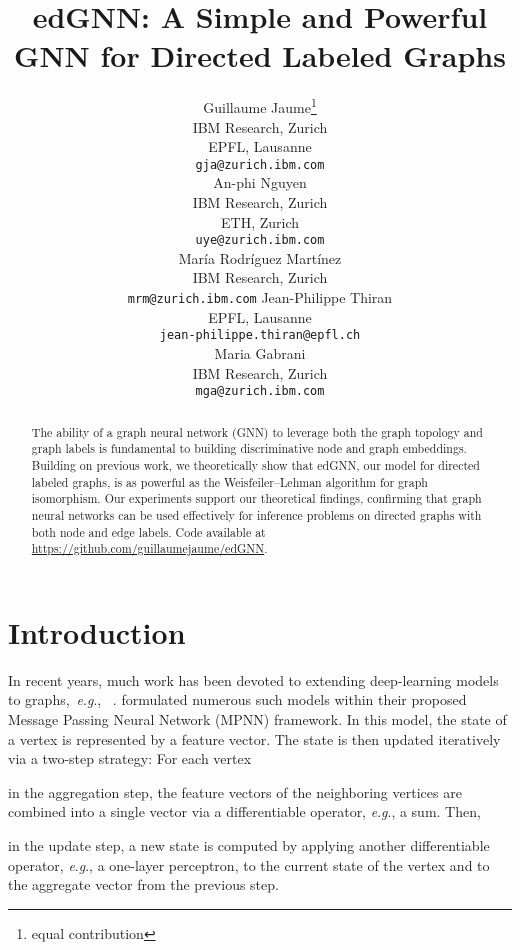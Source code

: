 \documentclass{article} \usepackage{iclr2019_conference,times}
\title{edGNN: A Simple and Powerful GNN for Directed Labeled Graphs}
\author{Guillaume Jaume\thanks{equal contribution} \\
IBM Research, Zurich \\
EPFL, Lausanne \\
\texttt{gja@zurich.ibm.com} \\
\And
An-phi Nguyen\footnotemark[1] \\
IBM Research, Zurich \\
ETH, Zurich \\
\texttt{uye@zurich.ibm.com} \\
\And 
Mar\'{i}a Rodr\'{i}guez Mart\'{i}nez \\
IBM Research, Zurich \\
\texttt{mrm@zurich.ibm.com}
\And 
Jean-Philippe Thiran \\
EPFL, Lausanne \\
\texttt{jean-philippe.thiran@epfl.ch} \\
\And
Maria Gabrani \\
IBM Research, Zurich \\
\texttt{mga@zurich.ibm.com} \\
}
\newcommand{\eg}{\textit{e}.\textit{g}., }
\begin{document}
\maketitle

\begin{abstract}

The ability of a graph neural network (GNN) to leverage both the graph topology and graph labels is fundamental to building discriminative node and graph embeddings. Building on previous work, we theoretically show that edGNN, our model for directed labeled graphs, is as powerful as the Weisfeiler--Lehman algorithm for graph isomorphism. Our experiments support our theoretical findings, confirming that graph neural networks can be  used effectively for inference problems on directed graphs with both node and edge labels. Code available at \url{https://github.com/guillaumejaume/edGNN}.

\end{abstract}













\section{Introduction}



In recent years, much work has been devoted to extending deep-learning models to graphs,~\eg~\cite{Scarselli2009, Bruna, Li2015b, Defferrard, Kipf2017, Hamilton2017, Hamilton2017a, Velickovic2017a, Ying2018a}. \cite{Gilmer2017a} formulated numerous such models within their proposed Message Passing Neural Network (MPNN) framework. In this model, the state of a vertex is represented by a feature vector. The state is then  updated iteratively via a two-step strategy: For each vertex \begin{inparaenum}[(i)]
\item in the aggregation step, the feature vectors of the neighboring vertices are combined into a single vector via a differentiable operator, \eg a sum. Then, 
\item in the update step, a new state is computed by applying another differentiable operator, \eg a one-layer perceptron, to the current state of the vertex and to the aggregate vector from the previous step.
\end{inparaenum} 
\end{document}
